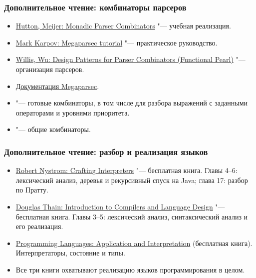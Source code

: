 \documentclass[11pt]{beamer}
\begin{document}
\begin{frame}[fragile]
  \frametitle{Дополнительное чтение: комбинаторы парсеров}
  \begin{itemize}
    \item \href{https://www.cs.nott.ac.uk/~pszgmh/monparsing.pdf}{Hutton, Meijer: Monadic Parser Combinators} "--- учебная реализация.
    \item \href{https://markkarpov.com/tutorial/megaparsec.html}{Mark Karpov: Megaparsec tutorial} "--- практическое руководство.
    \item \href{https://dl.acm.org/doi/10.1145/3471874.3472984}{Willis, Wu: Design Patterns for Parser Combinators (Functional Pearl)} "--- организация парсеров.
    \item \href{https://hackage.haskell.org/package/megaparsec/docs/Text-Megaparsec.html}{Документация Megaparsec}.
    \item {} "--- готовые комбинаторы, в том числе \href{https://hackage.haskell.org/package/parser-combinators/docs/Control-Monad-Combinators-Expr.html}{} для разбора выражений с заданными операторами и уровнями приоритета.
    \item \href{https://hackage.haskell.org/package/base/docs/Control-Applicative.html}{} "--- общие комбинаторы.
  \end{itemize}
\end{frame}
\begin{frame}[fragile]
  \frametitle{Дополнительное чтение: разбор и реализация языков}
  \begin{itemize}
    \item \href{https://craftinginterpreters.com/contents.html}{Robert Nystrom: Crafting Interpreters} "--- бесплатная книга. Главы 4--6: лексический анализ, деревья и рекурсивный спуск на Java; глава 17: разбор по Пратту.
    \item \href{https://dthain.github.io/books/compiler/}{Douglas Thain: Introduction to Compilers and Language Design} "--- бесплатная книга. Главы 3--5: лексический анализ, синтаксический анализ и его реализация.
    \item \href{https://www.plai.org/}{Programming Languages: Application and Interpretation} (бесплатная книга). Интерпретаторы, состояние и типы.
    \item Все три книги охватывают реализацию языков программирования в целом.
  \end{itemize}
\end{frame}
\end{document}
